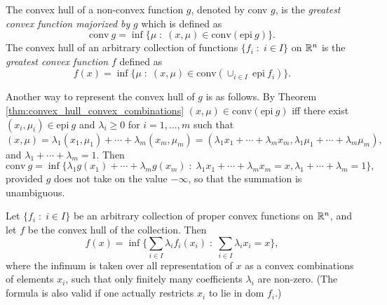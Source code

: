 \documentclass[11pt,a4paper]{article}
\begin{document}
\begin{definition}
    The {convex hull} of a non-convex function $g$, denoted by conv $g$, is the \textit{greatest convex function majorized by} $g$ which is defined as 
    \begin{equation*}
        \text{conv}\ g = \inf \{\mu\;:\;(x,\mu)\in \text{conv}(\text{epi}\ g)\}.
    \end{equation*}
    The convex hull of an arbitrary collection of functions $\{f_i\;:\;i\in I\}$ on $\mathbb{R}^n$ is the \textit{greatest convex function} $f$ defined as 
    \begin{equation*}
        f(x) = \inf \{\mu\;:\;(x,\mu)\in \text{conv}(\cup_{i\in I}\ \text{epi}\ f_i)\}.
    \end{equation*}
\end{definition}

\begin{remark}
    Another way to represent the convex hull of $g$ is as follows. By Theorem \ref{thm:convex_hull_convex_combinations} $(x,\mu)\in \text{conv}(\text{epi}\ g)$ iff there exist $(x_i,\mu_i)\in \text{epi}\ g$ and $\lambda_i\ge 0$ for $i = 1,\ldots,m$ such that 
    \begin{equation*}
        (x,\mu) = \lambda_1 (x_1,\mu_1) + \cdots + \lambda_m (x_m,\mu_m) = (\lambda_1 x_1 + \cdots + \lambda_m x_m,\lambda_1\mu_1+\cdots+\lambda_m\mu_m),
    \end{equation*}
    and $\lambda_1+\cdots+\lambda_m = 1$. Then
    \begin{equation*}
        \text{conv}\ g = \inf\{\lambda_1g(x_1)+\cdots+\lambda_mg(x_m)\;:\; \lambda_1x_1+\cdots+\lambda_mx_m = x, \lambda_1+\cdots+\lambda_m = 1\},
    \end{equation*}
    provided $g$ does not take on the value $-\infty$, so that the summation is unambiguous.
\end{remark}

\begin{theorem}
    Let $\{f_i\;:\;i\in I\}$ be an arbitrary collection of proper convex functions on $\mathbb{R}^n$, and let $f$ be the convex hull of the collection. Then
    \begin{equation*}
        f(x) = \inf\bigg\{\sum_{i\in I} \lambda_i f_i(x_i)\;:\;\sum_{i\in I}\lambda_i x_i = x\bigg\},
    \end{equation*}
    where the infimum is taken over all representation of $x$ as a convex combinations of elements $x_i$, such that only finitely many coefficients $\lambda_i$ are non-zero. (The formula is also valid if one actually restricts $x_i$ to lie in dom $f_i$.)
\end{theorem}
\end{document}
